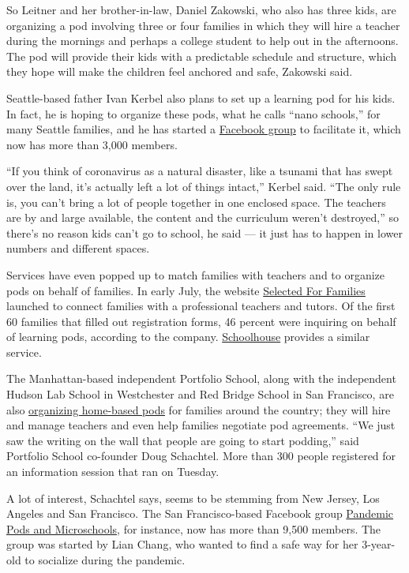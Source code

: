 So Leitner and her brother-in-law, Daniel Zakowski, who also has three
kids, are organizing a pod involving three or four families in which
they will hire a teacher during the mornings and perhaps a college
student to help out in the afternoons. The pod will provide their kids
with a predictable schedule and structure, which they hope will make the
children feel anchored and safe, Zakowski said.

Seattle-based father Ivan Kerbel also plans to set up a learning pod for
his kids. In fact, he is hoping to organize these pods, what he calls
``nano schools,'' for many Seattle families, and he has started a
\href{https://www.facebookcorewwwi.onion/groups/seattle.micro.schools/}{Facebook
group} to facilitate it, which now has more than 3,000 members.

``If you think of coronavirus as a natural disaster, like a tsunami that
has swept over the land, it's actually left a lot of things intact,''
Kerbel said. ``The only rule is, you can't bring a lot of people
together in one enclosed space. The teachers are by and large available,
the content and the curriculum weren't destroyed,'' so there's no reason
kids can't go to school, he said --- it just has to happen in lower
numbers and different spaces.

Services have even popped up to match families with teachers and to
organize pods on behalf of families. In early July, the website
\href{https://families.getselected.com/}{Selected For Families} launched
to connect families with a professional teachers and tutors. Of the
first 60 families that filled out registration forms, 46 percent were
inquiring on behalf of learning pods, according to the company.
\href{https://www.getschoolhouse.com/}{Schoolhouse} provides a similar
service.

The Manhattan-based independent Portfolio School, along with the
independent Hudson Lab School in Westchester and Red Bridge School in
San Francisco, are also \href{https://www.learning-pods.com/}{organizing
home-based pods} for families around the country; they will hire and
manage teachers and even help families negotiate pod agreements. ``We
just saw the writing on the wall that people are going to start
podding,'' said Portfolio School co-founder Doug Schachtel. More than
300 people registered for an information session that ran on Tuesday.

A lot of interest, Schachtel says, seems to be stemming from New Jersey,
Los Angeles and San Francisco. The San Francisco-based Facebook group
\href{https://www.facebookcorewwwi.onion/groups/pandemicpodsf}{Pandemic
Pods and Microschools}, for instance, now has more than 9,500 members.
The group was started by Lian Chang, who wanted to find a safe way for
her 3-year-old to socialize during the pandemic.

